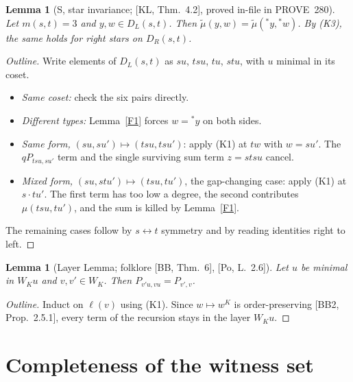 \documentclass[11pt]{amsart}
\newcommand{\tmu}{\tilde\mu}
\theoremstyle{plain}
\newtheorem{lemma}[theorem]{Lemma}
\theoremstyle{definition}
\begin{document}
\begin{lemma}[S, star invariance; {[KL, Thm.~4.2]}, proved in-file in PROVE~280]\label{S}
Let $m(s,t)=3$ and $y,w\in D_L(s,t)$. Then $\tmu(y,w)=\tmu({}^*y,{}^*w)$. By (K3), the same holds for right stars on $D_R(s,t)$.
\end{lemma}
\begin{proof}[Outline]
Write elements of $D_L(s,t)$ as $su$, $tsu$, $tu$, $stu$, with $u$ minimal in its coset.
\begin{itemize}[leftmargin=*,itemsep=0pt]
\item \emph{Same coset:} check the six pairs directly.
\item \emph{Different types:} Lemma~\ref{F1} forces $w={}^*y$ on both sides.
\item \emph{Same form,} $(su,su')\mapsto(tsu,tsu')$: apply (K1) at $tw$ with $w=su'$. The $qP_{tsu,su'}$ term and the single surviving sum term $z=stsu$ cancel.
\item \emph{Mixed form,} $(su,stu')\mapsto(tsu,tu')$, the gap-changing case: apply (K1) at $s\cdot tu'$. The first term has too low a degree, the second contributes $\mu(tsu,tu')$, and the sum is killed by Lemma~\ref{F1}.
\end{itemize}
The remaining cases follow by $s\leftrightarrow t$ symmetry and by reading identities right to left.
\end{proof}

\begin{lemma}[Layer Lemma; folklore {[BB, Thm.~6]}, {[Po, L.~2.6]}]
Let $u$ be minimal in $W_Ku$ and $v,v'\in W_K$. Then $P_{v'u,vu}=P_{v',v}$.
\end{lemma}
\begin{proof}[Outline]
Induct on $\ell(v)$ using (K1). Since $w\mapsto w^K$ is order-preserving [BB2, Prop.~2.5.1], every term of the recursion stays in the layer $W_Ku$.
\end{proof}

\section{Completeness of the witness set}
\end{document}
